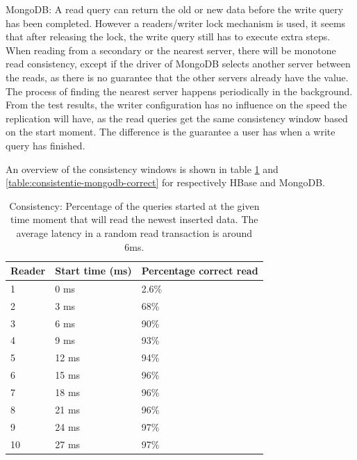 \documentclass[10pt,conference,letterpaper]{IEEEtran}
\begin{document}
MongoDB: A read query can return the old or new data before the write query has been completed. However a readers/writer lock mechanism is used, it seems that after releasing the lock, the write query still has to execute extra steps. When reading from a secondary or the nearest server, there will be monotone read consistency, except if the driver of MongoDB selects another server between the reads, as there is no guarantee that the other servers already have the value. The process of finding the nearest server happens periodically in the background. \\
From the test results, the writer configuration has no influence on the speed the replication will have, as the read queries get the same consistency window based on the start moment. The difference is the guarantee a user has when a write query has finished. 

An overview of the consistency windows is shown in table \ref{table:consistentie-hbase-correct} and \ref{table:consistentie-mongodb-correct} for respectively HBase and MongoDB. 

\begin{table}
\centering
\begin{tabular}{l| l l}
	\textbf{Reader} & \textbf{Start time (ms)} & \textbf{Percentage correct read} \\
	\hline
	1 &  0 ms & 2.6\%\\
	2 &  3 ms & 68\%\\
	3 &  6 ms & 90\%\\
	4 &  9 ms & 93\%\\
	5 &  12 ms & 94\%\\
	6 &  15 ms & 96\%\\
	7 &  18 ms & 96\%\\
	8 &  21 ms & 96\%\\
	9 &  24 ms & 97\%\\
	10 & 27 ms & 97\% 
\end{tabular}
\caption{Consistency: Percentage of the queries started at the given time moment that will read the newest inserted data. The average latency in a random read transaction is around 6ms.}
\label{table:consistentie-hbase-correct}
\end{table}
\end{document}
